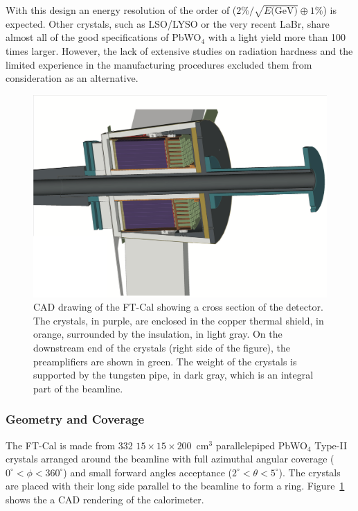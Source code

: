 With this design an energy resolution of the order of ($2\% /\sqrt{E\textrm{(GeV)}} \oplus 1\%$) is expected.
Other crystals, such as LSO/LYSO or the very recent LaBr, share almost all of the good specifications of
PbWO$_4$ with a light yield more than 100 times larger. However, the lack of extensive studies on radiation
hardness and the limited experience in the manufacturing procedures excluded them from consideration as an
alternative.

\begin{figure}[th!]
\centering 
\includegraphics[width=0.85\columnwidth]{fig/section.png} 
\caption{CAD drawing of the FT-Cal showing a cross section of the detector. The crystals, in purple, are enclosed in the copper thermal shield, in orange, surrounded by the insulation, in light gray. On the downstream end of the crystals (right side of the figure), the preamplifiers are shown in green. The weight of the crystals is supported by the tungsten pipe, in dark gray, which is an integral part of the beamline.}
\label{fig:ft-cal-geometry} 
\end{figure}

\subsubsection{Geometry and Coverage}

The FT-Cal is made from 332 $15\times 15\times 200$~cm$^3$ parallelepiped PbWO$_4$ Type-II crystals
arranged around the beamline with full azimuthal angular coverage ($0^\circ < \phi < 360^\circ$)  and small
forward angles acceptance ($2^\circ < \theta < 5^\circ$). The crystals are placed with their long side parallel to
the beamline to form a ring. Figure~\ref{fig:ft-cal-geometry} shows the a CAD rendering of the calorimeter. 

